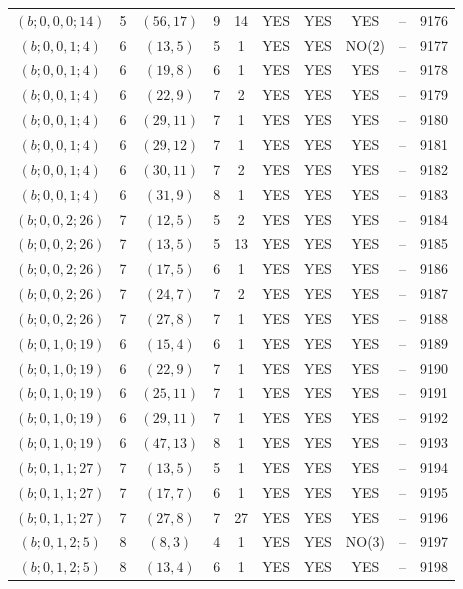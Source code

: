 \begin{longtable}{|c|c|c|c|c|c|c|c|c|c|}
$(b; 0, 0, 0; 14)$ & 5 & $(56, 17)$ & 9 & 14 & YES & YES & YES & -- & 9176\\
$(b; 0, 0, 1; 4)$ & 6 & $(13, 5)$ & 5 & 1 & YES & YES & NO(2) & -- & 9177\\
$(b; 0, 0, 1; 4)$ & 6 & $(19, 8)$ & 6 & 1 & YES & YES & YES & -- & 9178\\
$(b; 0, 0, 1; 4)$ & 6 & $(22, 9)$ & 7 & 2 & YES & YES & YES & -- & 9179\\
$(b; 0, 0, 1; 4)$ & 6 & $(29, 11)$ & 7 & 1 & YES & YES & YES & -- & 9180\\
$(b; 0, 0, 1; 4)$ & 6 & $(29, 12)$ & 7 & 1 & YES & YES & YES & -- & 9181\\
$(b; 0, 0, 1; 4)$ & 6 & $(30, 11)$ & 7 & 2 & YES & YES & YES & -- & 9182\\
$(b; 0, 0, 1; 4)$ & 6 & $(31, 9)$ & 8 & 1 & YES & YES & YES & -- & 9183\\
$(b; 0, 0, 2; 26)$ & 7 & $(12, 5)$ & 5 & 2 & YES & YES & YES & -- & 9184\\
$(b; 0, 0, 2; 26)$ & 7 & $(13, 5)$ & 5 & 13 & YES & YES & YES & -- & 9185\\
$(b; 0, 0, 2; 26)$ & 7 & $(17, 5)$ & 6 & 1 & YES & YES & YES & -- & 9186\\
$(b; 0, 0, 2; 26)$ & 7 & $(24, 7)$ & 7 & 2 & YES & YES & YES & -- & 9187\\
$(b; 0, 0, 2; 26)$ & 7 & $(27, 8)$ & 7 & 1 & YES & YES & YES & -- & 9188\\
$(b; 0, 1, 0; 19)$ & 6 & $(15, 4)$ & 6 & 1 & YES & YES & YES & -- & 9189\\
$(b; 0, 1, 0; 19)$ & 6 & $(22, 9)$ & 7 & 1 & YES & YES & YES & -- & 9190\\
$(b; 0, 1, 0; 19)$ & 6 & $(25, 11)$ & 7 & 1 & YES & YES & YES & -- & 9191\\
$(b; 0, 1, 0; 19)$ & 6 & $(29, 11)$ & 7 & 1 & YES & YES & YES & -- & 9192\\
$(b; 0, 1, 0; 19)$ & 6 & $(47, 13)$ & 8 & 1 & YES & YES & YES & -- & 9193\\
$(b; 0, 1, 1; 27)$ & 7 & $(13, 5)$ & 5 & 1 & YES & YES & YES & -- & 9194\\
$(b; 0, 1, 1; 27)$ & 7 & $(17, 7)$ & 6 & 1 & YES & YES & YES & -- & 9195\\
$(b; 0, 1, 1; 27)$ & 7 & $(27, 8)$ & 7 & 27 & YES & YES & YES & -- & 9196\\
$(b; 0, 1, 2; 5)$ & 8 & $(8, 3)$ & 4 & 1 & YES & YES & NO(3) & -- & 9197\\
$(b; 0, 1, 2; 5)$ & 8 & $(13, 4)$ & 6 & 1 & YES & YES & YES & -- & 9198\\

\end{longtable}
